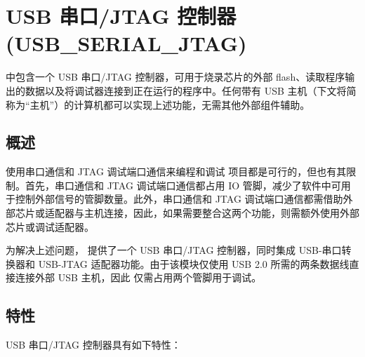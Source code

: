 \documentclass[main\_\_CN.tex]{subfiles}
\begin{document}

\ifglobal
\else
    {\let\clearpage\relax \listoftodos}
    {\let\clearpage\relax \listofdonetodos}
    \tableofcontents
\fi


\hypertarget{usbserialjtag}{}
\chapter{USB 串口/JTAG 控制器 (USB\_SERIAL\_JTAG)}
\label{mod:usbserialjtag}

\chipname{} 中包含一个 USB 串口/JTAG 控制器，可用于烧录芯片的外部 flash、读取程序输出的数据以及将调试器连接到正在运行的程序中。任何带有 USB 主机（下文将简称为“主机”）的计算机都可以实现上述功能，无需其他外部组件辅助。

\section{概述}

使用串口通信和 JTAG 调试端口通信来编程和调试 \chipname{} 项目都是可行的，但也有其限制。首先，串口通信和 JTAG 调试端口通信都占用 IO 管脚，减少了软件中可用于控制外部信号的管脚数量。此外，串口通信和 JTAG 调试端口通信都需借助外部芯片或适配器与主机连接，因此，如果需要整合这两个功能，则需额外使用外部芯片或调试适配器。

为解决上述问题，\chipname{} 提供了一个 USB 串口/JTAG 控制器，同时集成 USB-串口转换器和 USB-JTAG 适配器功能。由于该模块仅使用 USB 2.0 所需的两条数据线直接连接外部 USB 主机，因此 \chipname{} 仅需占用两个管脚用于调试。

\section{特性}
\label{sec:usbserialjtag-features}

USB 串口/JTAG 控制器具有如下特性：
\end{document}
